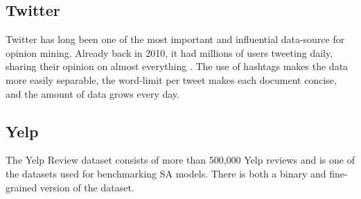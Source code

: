 \subsection{Twitter}
Twitter has long been one of the most important and influential data-source for opinion mining. Already back in 2010, it had millions of users tweeting daily, sharing their opinion on almost everything \cite{pak-paroubek-2010-twitter}. The use of hashtags makes the data more easily separable, the word-limit per tweet makes each document concise, and the amount of data grows every day.
\subsection{Yelp} 
The Yelp Review dataset \cite{zhang2016characterlevel} consists of more than 500,000 Yelp reviews and is one of the datasets used for benchmarking SA models. There is both a binary and fine-grained version of the dataset.


